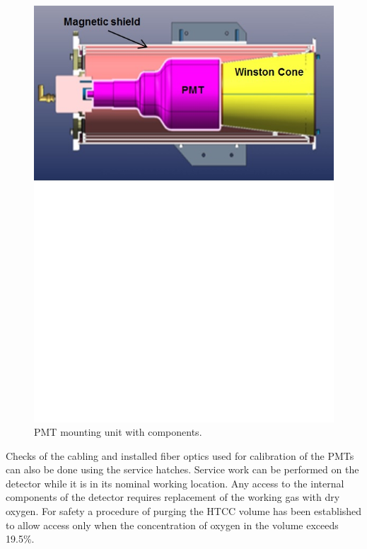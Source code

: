 \begin{figure}[ht]
    \centering
    \includegraphics[width=1.0\linewidth,trim={0 12cm 0 0},clip]{images/PMT_Mount.jpg}
    \caption{PMT mounting unit with components.}
    \label{fig:PMT_Mount}
\end{figure}

Checks of the cabling and installed fiber optics used for calibration of the PMTs can also be done using the
service hatches. Service work can be performed on the detector while it is in its nominal working location. Any
access to the internal components of the detector requires replacement of the working gas with dry oxygen. For
safety a procedure of purging the HTCC volume has been established to allow access only when the concentration
of oxygen in the volume exceeds 19.5\%.

